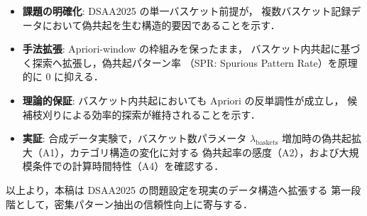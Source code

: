 \begin{itemize}
    \item \textbf{課題の明確化}: DSAA2025 の単一バスケット前提が，
    複数バスケット記録データにおいて偽共起を生む構造的要因であることを示す．

    \item \textbf{手法拡張}: Apriori-window の枠組みを保ったまま，
    バスケット内共起に基づく探索へ拡張し，偽共起パターン率
    （SPR: Spurious Pattern Rate）を原理的に 0 に抑える．

    \item \textbf{理論的保証}: バスケット内共起においても Apriori の反単調性が成立し，
    候補枝刈りによる効率的探索が維持されることを示す．

    \item \textbf{実証}: 合成データ実験で，バスケット数パラメータ
    $\lambda_{\text{baskets}}$ 増加時の偽共起拡大（A1），カテゴリ構造の変化に対する
    偽共起率の感度（A2），および大規模条件での計算時間特性（A4）を確認する．
\end{itemize}

以上より，本稿は DSAA2025 の問題設定を現実のデータ構造へ拡張する
第一段階として，密集パターン抽出の信頼性向上に寄与する．
